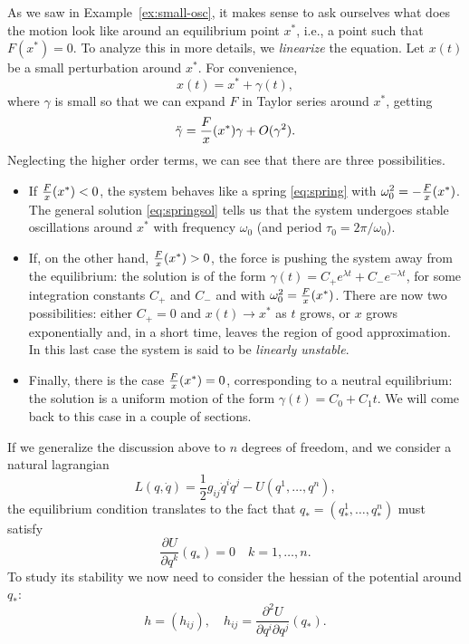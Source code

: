 \documentclass[english,fontsize=11pt,paper=a5,oneside]{scrbook}
\let\d\relax
\newcommand{\d}{\mathrm{d}}
\theoremstyle{definition}
\begin{document}
As we saw in Example~\ref{ex:small-osc}, it makes sense to ask ourselves what does the motion look like around an equilibrium point $x^*$, i.e., a point such that $F(x^*) = 0$.
To analyze this in more details, we \emph{linearize} the equation.
Let $x(t)$ be a small perturbation around $x^*$. For convenience,
\begin{equation}
  x(t) = x^* + \gamma(t),
\end{equation}
where $\gamma$ is small so that we can expand $F$ in Taylor series around $x^*$, getting
\begin{equation}
  \ddot \gamma = \frac{\d F}{\d x}(x^*)\gamma + O(\gamma^2).
\end{equation}
Neglecting the higher order terms, we can see that there are three possibilities.
\begin{itemize}
  \item If $\frac{\d F}{\d x}(x^*) < 0$, the system behaves like a spring \eqref{eq:spring} with $\omega_0^2 = -\frac{\d F}{\d x}(x^*)$. The general solution \eqref{eq:springsol} tells us that the system undergoes stable oscillations around $x^*$ with frequency $\omega_0$ (and period $\tau_0 = 2\pi/\omega_0$).
  \item If, on the other hand, $\frac{\d F}{\d x}(x^*) > 0$, the force is pushing the system away from the equilibrium: the solution is of the form $\gamma(t) = C_+ e^{\lambda t} + C_- e^{-\lambda t}$, for some integration constants $C_+$ and $C_-$ and with $\omega_0^2 = \frac{\d F}{\d x}(x^*)$. There are now two possibilities: either $C_+ = 0$ and $x(t) \to x^*$ as $t$ grows, or $x$ grows exponentially and, in a short time, leaves the region of good approximation. In this last case the system is said to be \emph{linearly unstable}.
  \item Finally, there is the case $\frac{\d F}{\d x}(x^*) = 0$, corresponding to a neutral equilibrium: the solution is a uniform motion of the form $\gamma(t) = C_0 + C_1 t$.
        We will come back to this case in a couple of sections.
\end{itemize}

If we generalize the discussion above to $n$ degrees of freedom, and we consider a natural lagrangian
\begin{equation}
  L(q,\dot q) = \frac12 g_{ij} \dot q^i \dot q^j - U(q^1, \ldots, q^n),
\end{equation}
the equilibrium condition translates to the fact that $q_* = (q_*^1, \ldots, q_*^n)$ must satisfy
\begin{equation}
  \frac{\partial U}{\partial q^k} (q_*) = 0 \quad k=1,\ldots,n.
\end{equation}
To study its stability we now need to consider the hessian of the potential around $q_*$:
\begin{equation}
  h = (h_{ij}),\quad h_{ij} = \frac{\partial^2 U}{\partial q^i\partial q^j} (q_*).
\end{equation}
\end{document}

